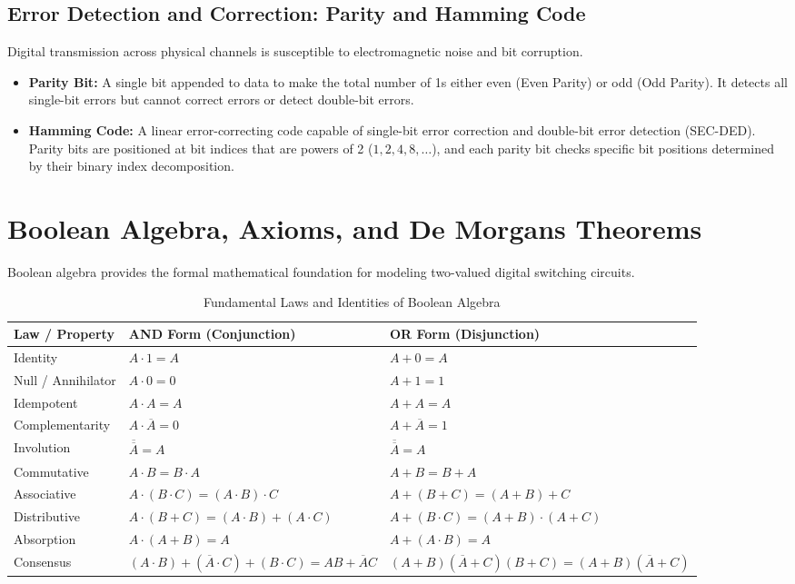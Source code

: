 \subsection{Error Detection and Correction: Parity and Hamming Code}
Digital transmission across physical channels is susceptible to electromagnetic noise and bit corruption.
\begin{itemize}
    \item \textbf{Parity Bit:} A single bit appended to data to make the total number of 1s either even (Even Parity) or odd (Odd Parity). It detects all single-bit errors but cannot correct errors or detect double-bit errors.
    \item \textbf{Hamming Code:} A linear error-correcting code capable of single-bit error correction and double-bit error detection (SEC-DED). Parity bits are positioned at bit indices that are powers of 2 ($1, 2, 4, 8, \dots$), and each parity bit checks specific bit positions determined by their binary index decomposition.
\end{itemize}

\section{Boolean Algebra, Axioms, and De Morgan\textquotesingle s Theorems}
Boolean algebra provides the formal mathematical foundation for modeling two-valued digital switching circuits.

\begin{table}[htbp]
\centering
\caption{Fundamental Laws and Identities of Boolean Algebra}
\label{tab:boolean-laws}
\begin{tabularx}{\textwidth}{l X X}
\toprule
\textbf{Law / Property} & \textbf{AND Form (Conjunction)} & \textbf{OR Form (Disjunction)} \\
\midrule
Identity & $A \cdot 1 = A$ & $A + 0 = A$ \\
Null / Annihilator & $A \cdot 0 = 0$ & $A + 1 = 1$ \\
Idempotent & $A \cdot A = A$ & $A + A = A$ \\
Complementarity & $A \cdot \overline{A} = 0$ & $A + \overline{A} = 1$ \\
Involution & $\overline{\overline{A}} = A$ & $\overline{\overline{A}} = A$ \\
Commutative & $A \cdot B = B \cdot A$ & $A + B = B + A$ \\
Associative & $A \cdot (B \cdot C) = (A \cdot B) \cdot C$ & $A + (B + C) = (A + B) + C$ \\
Distributive & $A \cdot (B + C) = (A \cdot B) + (A \cdot C)$ & $A + (B \cdot C) = (A + B) \cdot (A + C)$ \\
Absorption & $A \cdot (A + B) = A$ & $A + (A \cdot B) = A$ \\
Consensus & $(A \cdot B) + (\overline{A} \cdot C) + (B \cdot C) = AB + \overline{A}C$ & $(A+B)(\overline{A}+C)(B+C) = (A+B)(\overline{A}+C)$ \\
\bottomrule
\end{tabularx}
\end{table}

